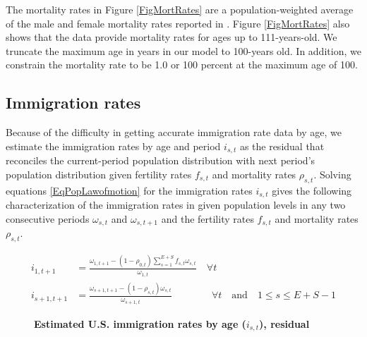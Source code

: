 \documentclass[letterpaper,12pt]{article}
\theoremstyle{definition}
\begin{document}
    The mortality rates in Figure \ref{FigMortRates} are a population-weighted average of the male and female mortality rates reported in \citet{SocSec:2015}. Figure \ref{FigMortRates} also shows that the data provide mortality rates for ages up to 111-years-old. We truncate the maximum age in years in our model to 100-years old. In addition, we constrain the mortality rate to be 1.0 or 100 percent at the maximum age of 100.


  \subsection{Immigration rates}\label{SecImmig}

    Because of the difficulty in getting accurate immigration rate data by age, we estimate the immigration rates by age and period $i_{s,t}$ as the residual that reconciles the current-period population distribution with next period's population distribution given fertility rates $f_{s,t}$ and mortality rates $\rho_{s,t}$. Solving equations \eqref{EqPopLawofmotion} for the immigration rates $i_{s,t}$ gives the following characterization of the immigration rates in given population levels in any two consecutive periods $\omega_{s,t}$ and $\omega_{s,t+1}$ and the fertility rates $f_{s,t}$ and mortality rates $\rho_{s,t}$.

    \begin{equation}\label{EqPopImmRates}
      \begin{split}
        i_{1,t+1} &= \frac{\omega_{1,t+1} - (1 - \rho_{0,t})\sum_{s=1}^{E+S}f_{s,t}\omega_{s,t}}{\omega_{1,t}}\quad\forall t \\
        i_{s+1,t+1} &= \frac{\omega_{s+1,t+1} - (1 - \rho_{s,t})\omega_{s,t}}{\omega_{s+1,t}}\qquad\qquad\forall t\quad\text{and}\quad 1\leq s \leq E+S-1
      \end{split}
    \end{equation}

    \begin{figure}[htbp]\centering \captionsetup{width=4.0in}
      \caption{\label{FigImmRates}\textbf{Estimated U.S. immigration rates by age ($i_{s,t}$), residual}}
    \end{figure}
\end{document}
